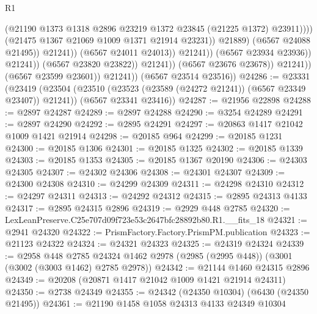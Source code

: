 \begin{lexlean}{R1}
\begin{coremodule}
                                                    (@21190
                                                      @1373
                                                      @1318
                                                      @2896
                                                      @23219
                                                      @1372
                                                      @23845
                                                      (@21225 @1372)
                                                      @23911))))
                                              (@21475 @1367 @21069 @1009 @1371 @21914 @23231))
                                            @21889)
                                          (@6567 @24088 @21495))
                                        @21241))
                                    (@6567 @24011 @24013))
                                  @21241))
                              (@6567 @23934 @23936))
                            @21241))
                        (@6567 @23820 @23822))
                      @21241))
                  (@6567 @23676 @23678))
                @21241))
            (@6567 @23599 @23601))
          @21241))
      (@6567 @23514 @23516))
@24286 := @23331
    (@23419
      (@23504 (@23510 (@23523 (@23589 (@24272 @21241)) (@6567 @23349 @23407)) @21241))
      (@6567 @23341 @23416))
@24287 := @21956 @22898
@24288 := @2897 @24287
@24289 := @2897 @24288
@24290 := @3254 @24289
@24291 := @2897 @24290
@24292 := @2895 @24291
@24297 := @20863 @1417 @21042 @1009 @1421 @21914
@24298 := @20185 @964
@24299 := @20185 @1231
@24300 := @20185 @1306
@24301 := @20185 @1325
@24302 := @20185 @1339
@24303 := @20185 @1353
@24305 := @20185 @1367 @20190
@24306 := @24303 @24305
@24307 := @24302 @24306
@24308 := @24301 @24307
@24309 := @24300 @24308
@24310 := @24299 @24309
@24311 := @24298 @24310
@24312 := @24297 @24311
@24313 := @24292 @24312
@24315 := @2895 @24313 @4133
@24317 := @2895 @24315 @2896
@24319 := @2929 @448 @2785
@24320 := LexLeanPreserve.C25e707d09f723e53c2647bfc28892b80.R1.__fits_18
@24321 := @2941 @24320
@24322 := PrismFactory.Factory.PrismPM.publication
@24323 := @21123 @24322
@24324 := @24321 @24323
@24325 := @24319 @24324
@24339 := @2958
    @448
    @2785
    @24324
    @1462
    @2978
    (@2985 (@2995 @448))
    (@3001 (@3002 (@3003 @1462) @2785 @2978))
@24342 := @21144 @1460 @24315 @2896
@24349 := @20208 (@20871 @1417 @21042 @1009 @1421 @21914 @24311)
@24350 := @2738 @24349
@24355 := @24342 (@24350 @10304) (@6430 (@24350 @21495))
@24361 := @21190 @1458 @1058 @24313 @4133 @24349 @10304

\end{coremodule}
\end{lexlean}
